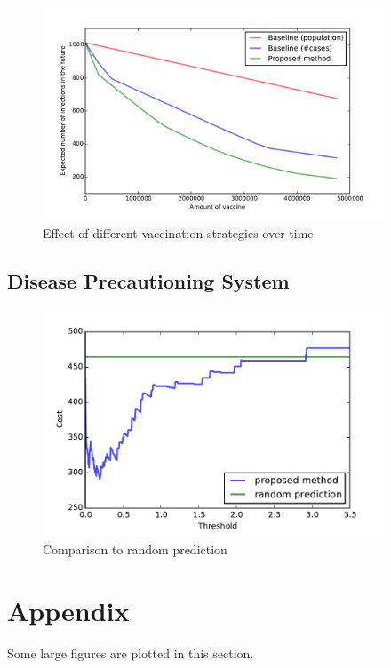 \documentclass[11pt]{article}
\begin{document}
\begin{figure}%
\begin{center}
  \includegraphics[width=4in]{graph/ev2.pdf}
  \caption{Effect of different vaccination strategies over time}
  \label{ev2}
\end{center}  
\end{figure}



\subsection{Disease Precautioning System}




\begin{figure}%
\begin{center}
  \includegraphics[width=4in]{graph/cost.pdf}
  \caption{Comparison to random prediction}
  \label{random}
\end{center}  
\end{figure}



\newpage




\newpage


\section*{Appendix}
\label{appendix}
Some large figures are plotted in this section.
\end{document}
